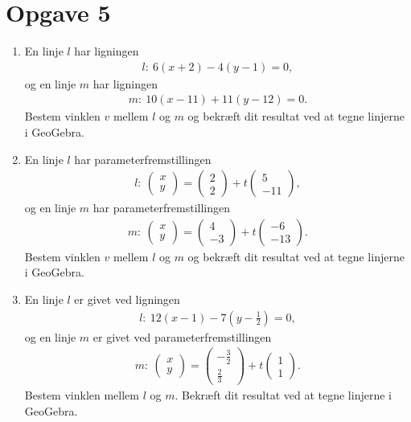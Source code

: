\section*{Opgave 5}
\begin{enumerate}[label=\roman*)]
	\item En linje $l$ har ligningen 
	\begin{align*}
		l: \ 6(x+2) -4(y-1) = 0,
	\end{align*}
	og en linje $m$ har ligningen 
	\begin{align*}
		m: \ 10(x-11) +11(y-12) =0.
	\end{align*}
	Bestem vinklen $v$ mellem $l$ og $m$ og bekræft dit resultat ved at tegne linjerne i GeoGebra.
	\item En linje $l$ har parameterfremstillingen 
	\begin{align*}
		l: \ 
		\begin{pmatrix}
			x \\ y
		\end{pmatrix} = 
		\begin{pmatrix}
			2 \\ 2
		\end{pmatrix} + t
		\begin{pmatrix}
			5 \\ -11
		\end{pmatrix},
	\end{align*}
	og en linje $m$ har parameterfremstillingen 
	\begin{align*}
		m: \ 
		\begin{pmatrix}
			x \\ y
		\end{pmatrix} = 
		\begin{pmatrix}
			4 \\ -3
		\end{pmatrix} + t
		\begin{pmatrix}
			-6 \\-13
		\end{pmatrix}.
	\end{align*}
	Bestem vinklen $v$ mellem $l$ og $m$ og bekræft dit resultat ved at tegne linjerne i GeoGebra.
	\item En linje $l$ er givet ved ligningen 
	\begin{align*}
		l: \ 12(x-1) -7(y-\frac{1}{2}) = 0,
	\end{align*}
	og en linje $m$ er givet ved parameterfremstillingen
	\begin{align*}
		m: \ 
		\begin{pmatrix}
			x \\ y
		\end{pmatrix} = 
		\begin{pmatrix}
			-\frac{3}{2} \\ \frac{2}{3}
		\end{pmatrix} + t
		\begin{pmatrix}
			1 \\ 1
		\end{pmatrix}.
	\end{align*}
	Bestem vinklen mellem $l$ og $m$. Bekræft dit resultat ved at tegne linjerne i GeoGebra.
\end{enumerate}
